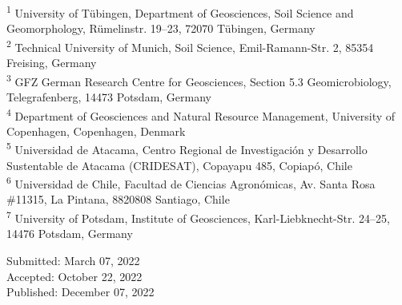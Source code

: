 \begin{scriptsize}
    \begin{justify}
        \textsuperscript{1} University of T{\"u}bingen, Department of Geosciences, Soil Science and Geomorphology, R{\"u}melinstr. 19--23, 72070 T{\"u}bingen, Germany\\
        \textsuperscript{2} Technical University of Munich, Soil Science, Emil-Ramann-Str. 2, 85354 Freising, Germany\\
        \textsuperscript{3} GFZ German Research Centre for Geosciences, Section 5.3 Geomicrobiology, Telegrafenberg, 14473 Potsdam, Germany\\
        \textsuperscript{4} Department of Geosciences and Natural Resource Management, University of Copenhagen, Copenhagen, Denmark\\
        \textsuperscript{5} Universidad de Atacama, Centro Regional de Investigaci{\'o}n y Desarrollo Sustentable de Atacama (CRIDESAT), Copayapu 485, Copiap{\'o}, Chile\\
        \textsuperscript{6} Universidad de Chile, Facultad de Ciencias Agron{\'o}micas, Av. Santa Rosa \#11315, La Pintana, 8820808 Santiago, Chile\\
        \textsuperscript{7} University of Potsdam, Institute of Geosciences, Karl-Liebknecht-Str. 24--25, 14476 Potsdam, Germany
    \end{justify}
\end{scriptsize}
    
\vspace{0.2cm}

\begin{flushleft}
    Submitted: March 07, 2022\\
    Accepted: October 22, 2022\\
    Published: December 07, 2022
\end{flushleft}

\cleardoublepage

